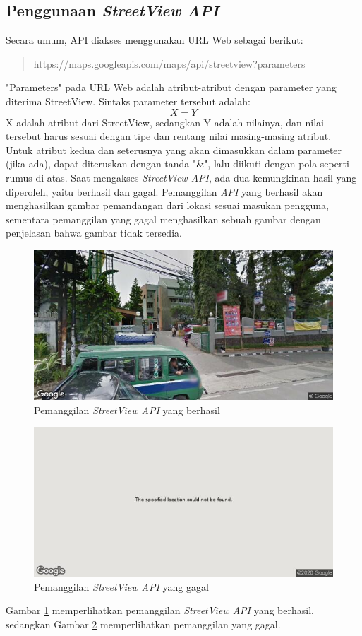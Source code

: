 \subsection{Penggunaan {\it StreetView API}}
\label{subs:streetview-usage}
Secara umum, API diakses menggunakan URL Web sebagai berikut:
\begin{quote}
https://maps.googleapis.com/maps/api/streetview?parameters
\end{quote}
"Parameters" pada URL Web adalah atribut-atribut dengan parameter yang diterima StreetView. Sintaks parameter tersebut adalah: $$ X = Y $$
X adalah atribut dari StreetView, sedangkan Y adalah nilainya, dan nilai tersebut harus sesuai dengan tipe dan rentang nilai masing-masing atribut. Untuk atribut kedua dan seterusnya yang akan dimasukkan dalam parameter (jika ada), dapat diteruskan dengan tanda "\&", lalu diikuti dengan pola seperti rumus di atas. Saat mengakses {\it StreetView API}, ada dua kemungkinan hasil yang diperoleh, yaitu berhasil dan gagal. Pemanggilan \textit{API} yang berhasil akan menghasilkan gambar pemandangan dari lokasi sesuai masukan pengguna, sementara pemanggilan yang gagal menghasilkan sebuah gambar dengan penjelasan bahwa gambar tidak tersedia. 

\begin{figure}[h]
		\includegraphics[scale=0.8]{Gambar/streetview.png}
	\caption{Pemanggilan \textit{StreetView API} yang berhasil}
	\label{fig:success-streetview}
\end{figure}

\begin{figure}[h]
		\includegraphics[scale=0.8]{Gambar/failed_streetview.png}
	\caption{Pemanggilan \textit{StreetView API} yang gagal}
	\label{fig:failed-streetview}
\end{figure}Gambar \ref{fig:success-streetview} memperlihatkan pemanggilan \textit{StreetView API} yang berhasil, sedangkan Gambar \ref{fig:failed-streetview} memperlihatkan pemanggilan yang gagal. 

